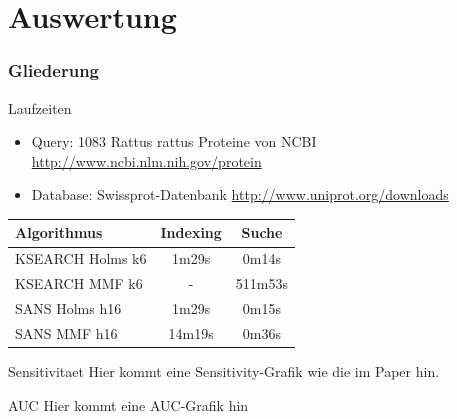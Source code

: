 \documentclass[xcolor=dvipsnames, aspectratio=1610]{beamer}
\begin{document}
\section{Auswertung}
  \begin{frame} 
    \frametitle{Gliederung}
    \tableofcontents[currentsection]
  \end{frame}

\begin{frame}{Laufzeiten}
  \begin{itemize}
    \item Query: 1083 Rattus rattus Proteine von NCBI \tiny{\url{http://www.ncbi.nlm.nih.gov/protein}}
    \item \normalsize{Database: Swissprot-Datenbank} \tiny{\url{http://www.uniprot.org/downloads}}
  \end{itemize}
  \begin{tabular}{l|cc}
    Algorithmus & Indexing & Suche \\
    \hline
    KSEARCH Holms k6 & 1m29s & 0m14s \\
    KSEARCH MMF k6 & -  & 511m53s \\
     SANS Holms h16 & 1m29s &  0m15s \\
       SANS MMF  h16 & 14m19s & 0m36s \\
  \end{tabular}
\end{frame}

\begin{frame}{Sensitivitaet}
  Hier kommt eine Sensitivity-Grafik wie die im Paper hin.
\end{frame}

\begin{frame}{AUC}
  Hier kommt eine AUC-Grafik hin
\end{frame}
\end{document}

